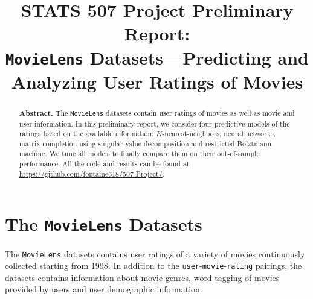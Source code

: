 \documentclass[bj, preprint]{imsart}
\begin{document}
\begin{frontmatter}

\title{{\Large STATS 507 Project Preliminary Report:} \\ 
\bf \texttt{MovieLens} Datasets---Predicting and Analyzing User Ratings of Movies}




\begin{abstract}
\textbf{Abstract.} The \texttt{MovieLens} datasets contain user ratings of movies as well as movie and user information. In this preliminary report, we consider four predictive models of the ratings based on the available information: $K$-nearest-neighbors, neural networks, matrix completion using singular value decomposition and  restricted Bolztmann machine. We tune all models to finally compare them on their out-of-sample performance. All the code and results can be found at \url{https://github.com/fontaine618/507-Project/}.
\end{abstract}

\end{frontmatter}


\tableofcontents

\section{The \texttt{MovieLens} Datasets}\label{sec:dataset}

The \texttt{MovieLens} datasets \citep{harper2015MovieLensDatasetsHistory} contains user ratings of a variety of movies continuously collected starting from 1998. 
In addition to the \texttt{user}-\texttt{movie}-\texttt{rating} pairings, the datasets contains information about movie genres, word tagging of movies provided by users and user demographic information. 
\end{document}
